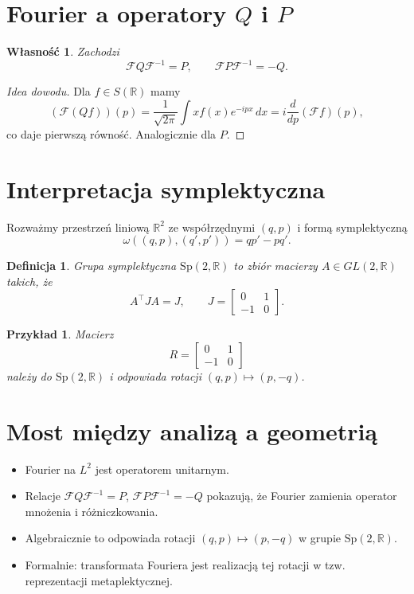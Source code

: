\documentclass[12pt]{article}
\newtheorem{defi}{Definicja}
\newtheorem{prop}{Własność}
\newtheorem{ex}{Przykład}
\newcommand{\Sp}{\mathrm{Sp}}
\begin{document}
\section{Fourier a operatory $Q$ i $P$}
\begin{prop}
Zachodzi
\[
\mathcal{F} Q \mathcal{F}^{-1} = P, \qquad 
\mathcal{F} P \mathcal{F}^{-1} = -Q.
\]
\end{prop}

\begin{proof}[Idea dowodu]
Dla $f\in S(\mathbb{R})$ mamy
\[
(\mathcal{F}(Qf))(p) = \frac{1}{\sqrt{2\pi}}\int x f(x) e^{-ipx}\,dx
= i\frac{d}{dp}(\mathcal{F}f)(p),
\]
co daje pierwszą równość. Analogicznie dla $P$.
\end{proof}

\section{Interpretacja symplektyczna}
Rozważmy przestrzeń liniową $\mathbb{R}^2$ ze współrzędnymi $(q,p)$ i formą symplektyczną
\[
\omega((q,p),(q',p')) = q p' - p q'.
\]

\begin{defi}
Grupa symplektyczna $\Sp(2,\mathbb{R})$ to zbiór macierzy $A\in GL(2,\mathbb{R})$ takich, że
\[
A^\top J A = J, \qquad 
J=\begin{bmatrix}0&1\\ -1&0\end{bmatrix}.
\]
\end{defi}

\begin{ex}
Macierz
\[
R=\begin{bmatrix}0&1\\ -1&0\end{bmatrix}
\]
należy do $\Sp(2,\mathbb{R})$ i odpowiada rotacji $(q,p)\mapsto(p,-q)$.
\end{ex}

\section{Most między analizą a geometrią}
\begin{itemize}
\item Fourier na $L^2$ jest operatorem unitarnym.
\item Relacje $\mathcal{F}Q\mathcal{F}^{-1}=P$, $\mathcal{F}P\mathcal{F}^{-1}=-Q$ pokazują, że Fourier zamienia operator mnożenia i różniczkowania.
\item Algebraicznie to odpowiada rotacji $(q,p)\mapsto(p,-q)$ w grupie $\Sp(2,\mathbb{R})$.
\item Formalnie: transformata Fouriera jest realizacją tej rotacji w tzw. reprezentacji metaplektycznej.
\end{itemize}
\end{document}
